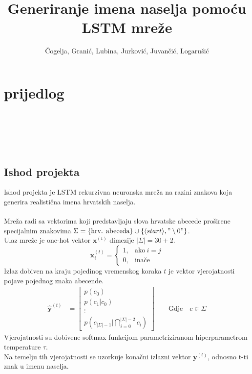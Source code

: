 \documentclass{report}
\title{Generiranje imena naselja pomoću LSTM mreže}
\author{Čogelja, Granić, Lubina, Jurković, Juvančić, Logarušić}
\begin{document}
\maketitle

\chapter*{prijedlog}
\ \\
\\
\\
\\

\section{Ishod projekta}
Ishod projekta je LSTM rekurzivna neuronska mreža na razini znakova koja generira realistična imena hrvatskih naselja.\\
\\
Mreža radi sa vektorima koji predstavljaju slova hrvatske abecede proširene specijalnim znakovima $\Sigma = \{ \text{hrv. abeceda}\} \cup \{\langle start \rangle, "\setminus 0"\}$.\\
Ulaz mreže je one-hot vektor $\mathbf{x}^{(t)}$ dimezije $\lvert \Sigma \rvert = 30 + 2$.
\begin{equation}
\mathbf{x}^{(t)}_i=
    \begin{cases}
      1, & \text{ako}\ i=j \\
      0, & \text{inače}
    \end{cases}
\end{equation}
Izlaz dobiven na kraju pojedinog vremenskog koraka $t$ je vektor vjerojatnosti pojave pojednog znaka abecende.\\
\begin{align}
    \hat{\mathbf{y}}^{(t)} &= \begin{bmatrix}
           p(c_0) \\
           p(c_1 | c_0) \\
           \vdots \\
           p(c_{\lvert \Sigma \rvert -1} | \bigcap_{i=0}^{\lvert \Sigma \rvert -2} c_i)
         \end{bmatrix}
         \quad \quad \text{Gdje} \quad c \in \Sigma
\end{align}
Vjerojatnosti su dobivene softmax funkcijom parametriziranom hiperparametrom temperature $\tau$.\\
Na temelju tih vjerojatnosti se uzorkuje konačni izlazni vektor $\mathbf{y}^{(t)}$, odnosno t-ti znak u imenu naselja.\\
\end{document}
